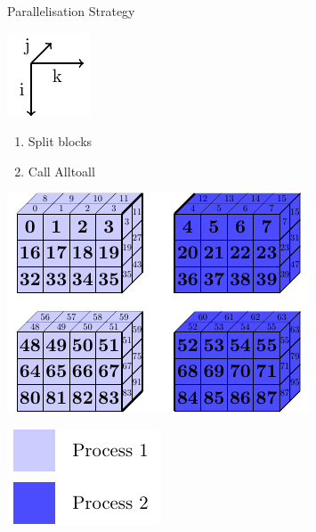 \documentclass{beamer}
\begin{document}
\begin{frame}{Parallelisation Strategy}
 \begin{minipage}{.3\textwidth}
 \includegraphics[width=.4\textwidth]{SplitConcat3D/Axes}
 \vspace{4em}
 
  \begin{enumerate}
   \item Split blocks 
   \item Call Alltoall
  \end{enumerate}
  
  \vspace{4em}
 \end{minipage}
 \begin{minipage}{.65\textwidth}
  \includegraphics[width=.8\textwidth]{SplitConcat3D/RecvDistrib1_2}
  
  \vspace{1em}
  
  \hfill\includegraphics[width=.3\textwidth]{SplitConcat3D/Legend}
 \end{minipage}
\end{frame}
\end{document}
